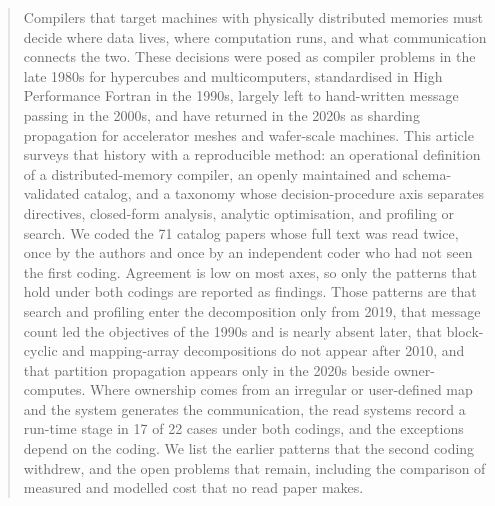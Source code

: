 \begin{abstract}
Compilers that target machines with physically distributed memories must decide where data lives, where computation runs, and what communication connects the two. These decisions were posed as compiler problems in the late 1980s for hypercubes and multicomputers, standardised in High Performance Fortran in the 1990s, largely left to hand-written message passing in the 2000s, and have returned in the 2020s as sharding propagation for accelerator meshes and wafer-scale machines. This article surveys that history with a reproducible method: an operational definition of a distributed-memory compiler, an openly maintained and schema-validated catalog, and a taxonomy whose decision-procedure axis separates directives, closed-form analysis, analytic optimisation, and profiling or search. We coded the 71 catalog papers whose full text was read twice, once by the authors and once by an independent coder who had not seen the first coding. Agreement is low on most axes, so only the patterns that hold under both codings are reported as findings. Those patterns are that search and profiling enter the decomposition only from 2019, that message count led the objectives of the 1990s and is nearly absent later, that block-cyclic and mapping-array decompositions do not appear after 2010, and that partition propagation appears only in the 2020s beside owner-computes. Where ownership comes from an irregular or user-defined map and the system generates the communication, the read systems record a run-time stage in 17 of 22 cases under both codings, and the exceptions depend on the coding. We list the earlier patterns that the second coding withdrew, and the open problems that remain, including the comparison of measured and modelled cost that no read paper makes.
\end{abstract}
